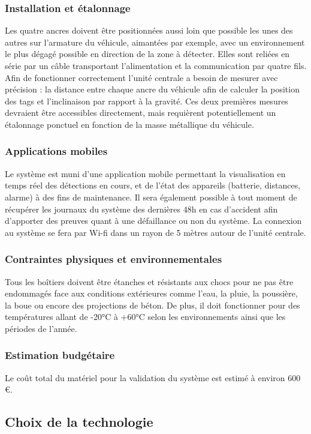 \subsubsection{Installation et étalonnage}
Les quatre ancres doivent être positionnées aussi loin que possible les unes des autres sur l’armature du véhicule, aimantées par exemple, avec un environnement le plus dégagé possible en direction de la zone à détecter. Elles sont reliées en série par un câble transportant l’alimentation et la communication par quatre fils.
Afin de fonctionner correctement l’unité centrale a besoin de mesurer avec précision : la distance entre chaque ancre du véhicule afin de calculer la position des tags et l’inclinaison par rapport à la gravité. Ces deux premières mesures devraient être accessibles directement, mais requièrent potentiellement un étalonnage ponctuel en fonction de la masse métallique du véhicule.

\subsubsection{Applications mobiles}
Le système est muni d’une application mobile permettant la visualisation en temps réel des détections en cours, et de l’état des appareils (batterie, distances, alarme) à des fins de maintenance. Il sera également possible à tout moment de récupérer les journaux du système des dernières 48h en cas d’accident afin d’apporter des preuves quant à une défaillance ou non du système. La connexion au système se fera par Wi-fi dans un rayon de 5 mètres autour de l’unité centrale.

\subsubsection{Contraintes physiques et environnementales}
Tous les boîtiers doivent être étanches et résistants aux chocs pour ne pas être endommagés face aux conditions extérieures comme l’eau, la pluie, la poussière, la boue ou encore des projections de béton. De plus, il doit fonctionner pour des températures allant de -20°C à +60°C selon les environnements ainsi que les périodes de l’année.

\subsubsection{Estimation budgétaire}
Le coût total du matériel pour la validation du système est estimé à environ 600 €.


\subsection{Choix de la technologie}

